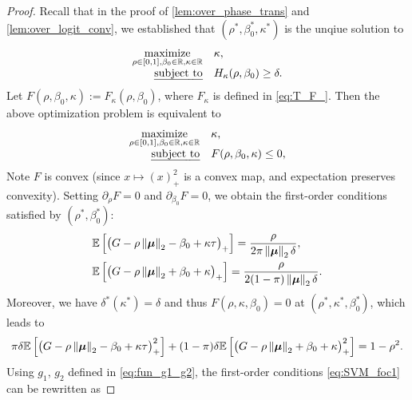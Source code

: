 \begin{proof}
    Recall that in the proof of \cref{lem:over_phase_trans} and \ref{lem:over_logit_conv}, we established that $(\rho^*, \beta_0^*, \kappa^*)$ is the unqiue solution to
    \begin{equation*}
        \begin{array}{rl}
        \operatorname*{\mathrm{maximize}}\limits_{\rho \in [0, 1], \beta_0 \in \mathbb{R}, \kappa \in \mathbb{R}} & \kappa, \\
        \text{\emph{subject to}} & H_\kappa(\rho, \beta_0) \ge \delta.
        \end{array}
    \end{equation*}
    Let $F(\rho, \beta_0, \kappa) := F_\kappa(\rho, \beta_0)$, where $F_\kappa$ is defined in \cref{eq:T_F_}. Then the above optimization problem is equivalent to
    \begin{equation*}
        \begin{array}{rl}
        \operatorname*{\mathrm{maximize}}\limits_{\rho \in [0, 1], \beta_0 \in \mathbb{R}, \kappa \in \mathbb{R}} & \kappa, \\
        \text{\emph{subject to}} & F(\rho, \beta_0, \kappa) \le 0,
        \end{array}
    \end{equation*}
    Note $F$ is convex (since $x \mapsto (x)_+^2$ is a convex map, and expectation preserves convexity). Setting $\partial_{\rho} F = 0$ and $\partial_{\beta_0} F = 0$, we obtain the first-order conditions satisfied by $(\rho^*, \beta_0^*)$:
    \begin{equation}
        \label{eq:SVM_foc1}
    \begin{aligned}
    & \mathbb{E} \left[ \big( G - \rho \left\|{\text{\boldmath $\mu$}}\right\|_2 - \beta_0 + \kappa \tau \big)_+ \right] = \frac{\rho}{2 \pi \left\|{\text{\boldmath $\mu$}}\right\|_2 \delta}, \\
    & \mathbb{E} \left[ \big( G - \rho \left\|{\text{\boldmath $\mu$}}\right\|_2 + \beta_0 + \kappa \big)_+ \right] = \frac{\rho}{2 (1 - \pi) \left\|{\text{\boldmath $\mu$}}\right\|_2 \delta}.
    \end{aligned}
    \end{equation}
Moreover, we have $\delta^*(\kappa^*) = \delta$ and thus $F(\rho, \kappa, \beta_0) = 0$ at $(\rho^*, \kappa^*, \beta_0^*)$, which leads to
\begin{equation}\label{eq:SVM_foc2}
    \pi \delta \mathbb{E} \left[ \big( G - \rho \left\|{\text{\boldmath $\mu$}}\right\|_2 - \beta_0 + \kappa \tau \big)_+^2 \right]  + (1-\pi) \delta \mathbb{E} \left[ \big( G - \rho \left\|{\text{\boldmath $\mu$}}\right\|_2 + \beta_0 + \kappa \big)_+^2 \right] = 1 - \rho^2.
\end{equation}
Using $g_1$, $g_2$ defined in \cref{eq:fun_g1_g2}, the first-order conditions \cref{eq:SVM_foc1} can be rewritten as

\end{proof}
